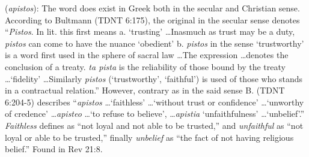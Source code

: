 \item[Unfaithful,]

(\textit{apistos}):
The word does exist in Greek both in the secular and Christian sense. According to Bultmann (TDNT 6:175), the original  in the secular sense denotes ``\emph{Pistos}. In lit. this first means  a. `trusting' \ldots Inasmuch as trust may be a duty, \emph{pistos} can come to have the nuance `obedient' b. \emph{pistos} in the sense `trustworthy' is a word first used in the sphere of sacral law \ldots The expression \ldots denotes the conclusion of a treaty. \emph{ta pista} is the reliability of those bound by the treaty \ldots `fidelity' \ldots Similarly \emph{pistos} (`trustworthy', `faithful') is used of those who stands in a contractual relation.'' However, contrary as in the said sense B. (TDNT 6:204-5) describes ``\emph{apistos} \ldots `faithless' \ldots `without trust or confidence' \ldots `unworthy of credence' \ldots \emph{apisteo} \ldots `to refuse to believe', \ldots \emph{apistia} `unfaithfulness' \ldots `unbelief'.'' \emph{Faithless} defines as ``not loyal and not able to be trusted,'' and \emph{unfaithful} as ``not loyal or able to be trusted,'' finally \emph{unbelief} as ``the fact of not having religious belief.''
Found in Rev 21:8.
